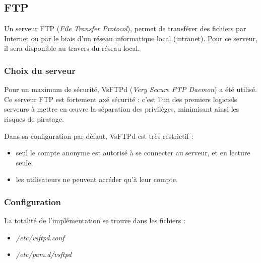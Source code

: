 \subsection{FTP}
\label{subsec:ftp}

Un serveur FTP (\emph{File Transfer Protocol}), permet de transférer des
fichiers par Internet ou par le biais d'un réseau informatique local
(intranet). Pour ce serveur, il sera disponible au travers du réseau local.

\subsubsection{Choix du serveur}
\label{subsubsec:choix-serveur}

Pour un maximum de sécurité, VsFTPd (\emph{Very Secure FTP Daemon}) a été utilisé. \\
Ce serveur FTP est fortement axé sécurité : c'est l'un des premiers logiciels
serveurs à mettre en \oe{}uvre la séparation des privilèges, minimisant ainsi les
risques de piratage.

Dans sa configuration par défaut, VsFTPd est très restrictif :

\begin{itemize}
    \item seul le compte anonyme est autorisé à se connecter au serveur, et en
      lecture seule;

    \item les utilisateurs ne peuvent accéder qu'à leur compte.
\end{itemize}

\subsubsection{Configuration}
\label{subsubsec:config}

La totalité de l'implémentation se trouve dans les fichiers :

\begin{itemize}
\item \textit{/etc/vsftpd.conf}

\item \textit{/etc/pam.d/vsftpd}
\end{itemize}


